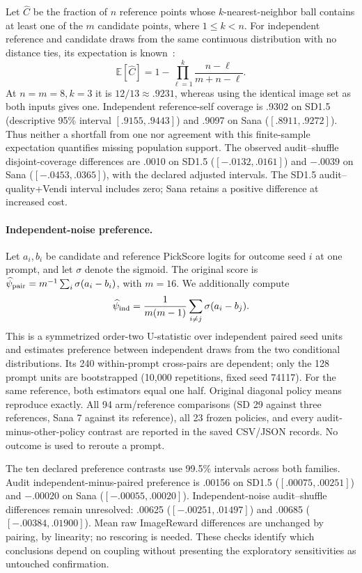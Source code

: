 Let $\widehat C$ be the fraction of $n$ reference points whose
$k$-nearest-neighbor ball contains at least one of the $m$ candidate points,
where $1\leq k<n$. For independent reference and candidate draws from the
same continuous distribution with no distance ties, its expectation is
known~\cite[Lemma~2]{naeem2020density}:
\begin{equation}
 \mathbb E[\widehat C]=1-\prod_{\ell=1}^{k}\frac{n-\ell}{m+n-\ell}.
\label{eq:supp_expected_coverage}
\end{equation}
At $n=m=8,k=3$ it is $12/13\approx.9231$, whereas using the identical image set as both inputs gives one. Independent reference-self coverage is .9302 on SD1.5 (descriptive 95\% interval $[.9155,.9443]$) and .9097 on Sana ($[.8911,.9272]$). Thus neither a shortfall from one nor agreement with this finite-sample expectation quantifies missing population support. The observed audit--shuffle disjoint-coverage differences are .0010 on SD1.5 ($[-.0132,.0161]$) and $-.0039$ on Sana ($[-.0453,.0365]$), with the declared adjusted intervals. The SD1.5 audit--quality+Vendi interval includes zero; Sana retains a positive difference at increased cost.

\paragraph{Independent-noise preference.}
Let $a_i,b_i$ be candidate and reference PickScore logits for outcome seed $i$ at one prompt, and let $\sigma$ denote the sigmoid. The original score is $\widehat\psi_{\rm pair}=m^{-1}\sum_i\sigma(a_i-b_i)$, with $m=16$. We additionally compute
\begin{equation}
 \widehat\psi_{\rm ind}=\frac{1}{m(m-1)}\sum_{i\ne j}\sigma(a_i-b_j).
\label{eq:supp_independent_preference}
\end{equation}
This is a symmetrized order-two U-statistic over independent paired seed units and estimates preference between independent draws from the two conditional distributions. Its 240 within-prompt cross-pairs are dependent; only the 128 prompt units are bootstrapped (10,000 repetitions, fixed seed 74117). For the same reference, both estimators equal one half. Original diagonal policy means reproduce exactly. All 94 arm/reference comparisons (SD 29 against three references, Sana 7 against its reference), all 23 frozen policies, and every audit-minus-other-policy contrast are reported in the saved CSV/JSON records. No outcome is used to reroute a prompt.

The ten declared preference contrasts use 99.5\% intervals across both families. Audit independent-minus-paired preference is .00156 on SD1.5 ($[.00075,.00251]$) and $-.00020$ on Sana ($[-.00055,.00020]$). Independent-noise audit--shuffle differences remain unresolved: .00625 ($[-.00251,.01497]$) and .00685 ($[-.00384,.01900]$). Mean raw ImageReward differences are unchanged by pairing, by linearity; no rescoring is needed. These checks identify which conclusions depend on coupling without presenting the exploratory sensitivities as untouched confirmation.




